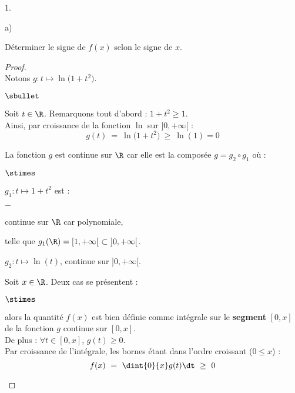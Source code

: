 \documentclass[11pt]{article}%
\begin{document}
\begin{noliste}{1.}
  \setlength{\itemsep}{4mm}
\item
  \begin{noliste}{a)}
    \setlength{\itemsep}{2mm}
  \item Déterminer le signe de $f(x)$ selon le signe de $x$.
  \end{noliste}
    
  \begin{proof}~\\%
    Notons $g : t \mapsto \ln\big( 1 + t^2 \big)$.
    \begin{noliste}{$\sbullet$}
    \item Soit $t \in \R$. Remarquons tout d'abord : $1 + t^2 \geq 1$.\\
      Ainsi, par croissance de la fonction $\ln$ sur $]0, +\infty[$ :
      \[
      g(t) \ = \ \ln\big( 1 + t^2 \big) \ \geq \ \ln(1) = 0
      \]

    \item La fonction $g$ est continue sur $\R$ car elle est la
      composée $g = g_2 \circ g_1$ où :
      \begin{noliste}{$\stimes$}
      \item $g_1 : t \mapsto 1 + t^2$ est : 
        \begin{noliste}{$-$}
        \item continue sur $\R$ car polynomiale,
        \item telle que $g_1(\R) = [1, +\infty[ \ \subset \ ]0,
          +\infty[$.
        \end{noliste}
        
      \item $g_2 : t \mapsto \ln(t)$, continue sur $]0, +\infty[$.
      \end{noliste}

    \item Soit $x \in \R$. Deux cas se présentent :
      \begin{noliste}{$\stimes$}
      \item {} alors la quantité $f(x)$ est bien
        définie comme intégrale sur le {\bf segment} $[0, x]$ de la
        fonction $g$ continue sur $[0, x]$.\\
        De plus : $\forall t \in [0, x]$, $g(t) \geq 0$.\\[.2cm]
        Par croissance de l'intégrale, les bornes étant dans l'ordre
        croissant ($0 \leq x$) :
        \[
        f(x) \ = \ \dint{0}{x} g(t) \dt \ \geq \ 0
        \]


\end{noliste}
\end{noliste}
\end{proof}
\end{noliste}
\end{document}
